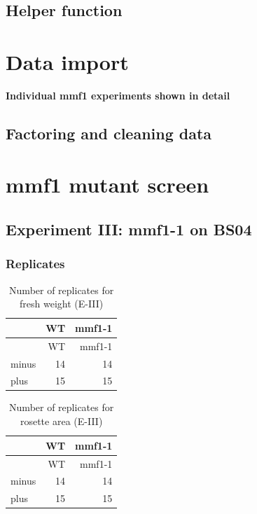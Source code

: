 \documentclass[
  10pt,
]{article}
\begin{document}
\subsection{Helper function}\label{helper-function}

\newpage

\section{\texorpdfstring{\textbf{Data
import}}{Data import}}\label{data-import}

\textbf{Individual mmf1 experiments shown in detail}

\subsection{Factoring and cleaning
data}\label{factoring-and-cleaning-data}

\newpage

\section{\texorpdfstring{\textbf{mmf1 mutant
screen}}{mmf1 mutant screen}}\label{mmf1-mutant-screen}

\subsection{\texorpdfstring{\textbf{Experiment III: mmf1-1 on
BS04}}{Experiment III: mmf1-1 on BS04}}\label{experiment-iii-mmf1-1-on-bs04}

\subsubsection{\texorpdfstring{\textbf{Replicates}}{Replicates}}\label{replicates}

\begin{longtable}[]{@{}lrr@{}}
\caption{Number of replicates for fresh weight (E-III)}\tabularnewline
\toprule\noalign{}
& WT & mmf1-1 \\
\midrule\noalign{}
\endfirsthead
\toprule\noalign{}
& WT & mmf1-1 \\
\midrule\noalign{}
\endhead
\bottomrule\noalign{}
\endlastfoot
minus & 14 & 14 \\
plus & 15 & 15 \\
\end{longtable}

\begin{longtable}[]{@{}lrr@{}}
\caption{Number of replicates for rosette area (E-III)}\tabularnewline
\toprule\noalign{}
& WT & mmf1-1 \\
\midrule\noalign{}
\endfirsthead
\toprule\noalign{}
& WT & mmf1-1 \\
\midrule\noalign{}
\endhead
\bottomrule\noalign{}
\endlastfoot
minus & 14 & 14 \\
plus & 15 & 15 \\
\end{longtable}
\end{document}
